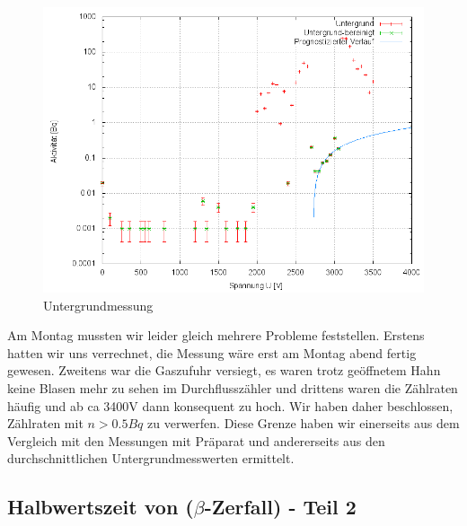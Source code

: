 \begin{figure}[H]
 \centering \includegraphics[width = 0.99\linewidth]{Messwerte/plots/untergrund_we_bereinigt.png}
 \caption{Untergrundmessung}
\end{figure}


Am Montag mussten wir leider gleich mehrere Probleme feststellen. Erstens hatten wir uns verrechnet, die Messung wäre erst am Montag abend fertig gewesen. Zweitens war die Gaszufuhr versiegt, es waren trotz geöffnetem Hahn keine Blasen mehr zu sehen im Durchflusszähler und drittens waren die Zählraten häufig und ab ca 3400V dann konsequent zu hoch. Wir haben daher beschlossen, Zählraten mit $ n > 0.5 Bq$ zu verwerfen. Diese Grenze haben wir einerseits aus dem Vergleich mit den Messungen mit Präparat und andererseits aus den durchschnittlichen Untergrundmesswerten ermittelt.


\subsection{Halbwertszeit von  ($\beta$-Zerfall) - Teil 2}

